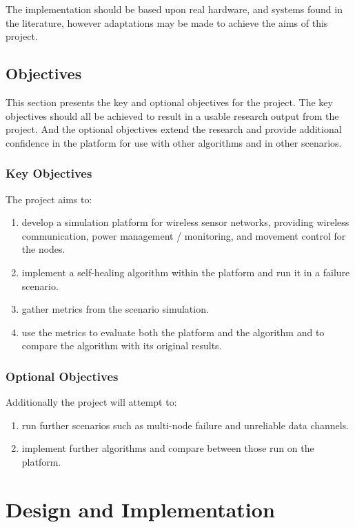 \documentclass[authoryearcitations]{UoYCSproject}
\begin{document}
The implementation should be based upon real hardware, and systems found in the literature, however adaptations may be made to achieve the aims of this project.

\section{Objectives}

This section presents the key and optional objectives for the project. The key objectives should all be achieved to result in a usable research output from the project. And the optional objectives extend the research and provide additional confidence in the platform for use with other algorithms and in other scenarios.

\subsection{Key Objectives}
The project aims to:
\begin{enumerate}
\item develop a simulation platform for wireless sensor networks, providing wireless communication, power management / monitoring, and movement control for the nodes.
\item implement a self-healing algorithm within the platform and run it in a failure scenario.
\item gather metrics from the scenario simulation.
\item use the metrics to evaluate both the platform and the algorithm and to compare the algorithm with its original results.
\end{enumerate}

\subsection{Optional Objectives}
Additionally the project will attempt to:
\begin{enumerate}
\item run further scenarios such as multi-node failure and unreliable data channels.
\item implement further algorithms and compare between those run on the platform.
\end{enumerate}

\chapter{Design and Implementation}
\label{cha:Design}
\end{document}
